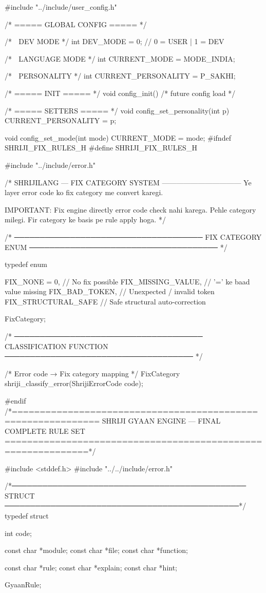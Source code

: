 \documentclass{article}
\begin{document}
#include "../include/user_config.h"

/* ===== GLOBAL CONFIG ===== */

/* 🌸 DEV MODE */
int DEV_MODE = 0;  // 0 = USER | 1 = DEV

/* 🌸 LANGUAGE MODE */
int CURRENT_MODE = MODE_INDIA;

/* 🌸 PERSONALITY */
int CURRENT_PERSONALITY = P_SAKHI;

/* ===== INIT ===== */
void config_init()
{
    /* future config load */
}

/* ===== SETTERS ===== */
void config_set_personality(int p)
{
    CURRENT_PERSONALITY = p;
}

void config_set_mode(int mode)
{
    CURRENT_MODE = mode;
}
#ifndef SHRIJI_FIX_RULES_H
#define SHRIJI_FIX_RULES_H

#include "../include/error.h"

/*
    SHRIJILANG — FIX CATEGORY SYSTEM
    ---------------------------------
    Ye layer error code ko fix category me convert karegi.

    IMPORTANT:
    Fix engine directly error code check nahi karega.
    Pehle category milegi.
    Fir category ke basis pe rule apply hoga.
*/

/* ─────────────────────────────────────
   FIX CATEGORY ENUM
───────────────────────────────────── */

typedef enum {

    FIX_NONE = 0,              // No fix possible
    FIX_MISSING_VALUE,         // '=' ke baad value missing
    FIX_BAD_TOKEN,             // Unexpected / invalid token
    FIX_STRUCTURAL_SAFE        // Safe structural auto-correction

} FixCategory;


/* ─────────────────────────────────────
   CLASSIFICATION FUNCTION
───────────────────────────────────── */

/*
    Error code → Fix category mapping
*/
FixCategory shriji_classify_error(ShrijiErrorCode code);


#endif
/*=============================================================
  SHRIJI GYAAN ENGINE — FINAL COMPLETE RULE SET
=============================================================*/

#include <stddef.h>
#include "../../include/error.h"

/*──────────────────────────────────────────────
  STRUCT
──────────────────────────────────────────────*/
typedef struct {
    int code;

    const char *module;
    const char *file;
    const char *function;

    const char *rule;
    const char *explain;
    const char *hint;

} GyaanRule;
\end{document}
